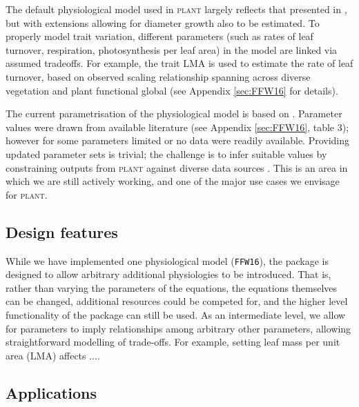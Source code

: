 \documentclass[a4paper,11pt]{article}
\newcommand{\plant}{\textsc{plant}}
\begin{document}
The default physiological model used in {\plant} largely reflects that
presented in \citet{Falster-2011}, but with extensions allowing for
diameter growth also to be estimated. To properly model trait
variation, different parameters (such as rates of leaf turnover,
respiration, photosynthesis per leaf area) in the model are linked via
assumed tradeoffs. For example, the trait LMA is used to estimate the
rate of leaf turnover, based on observed scaling relationship spanning
across diverse vegetation and plant functional global
\citep{Wright-2004} (see Appendix \ref{sec:FFW16} for details).

The current parametrisation of the physiological model is based on
\citet{Falster-2011}. Parameter values were drawn from available
literature (see Appendix \ref{sec:FFW16}, table 3); however for some
parameters limited or no data were readily available. Providing
updated parameter sets is trivial; the challenge is to infer suitable
values by constraining outputs from {\plant} against diverse data
sources \citep{Lebauer-2012, Keenan-2013}. This is an area in which we
are still actively working, and one of the major use cases we envisage
for {\plant}.

\subsection{Design features}

While we have implemented one physiological model (\texttt{FFW16}),
the package is designed to allow arbitrary additional physiologies to
be introduced.  That is, rather than varying the parameters of the
equations, the equations themselves can be changed, additional
resources could be competed for, and the higher level functionality of
the package can still be used.  As an intermediate level, we allow for
parameters to imply relationships among arbitrary other parameters,
allowing straightforward modelling of trade-offs.  For example,
setting leaf mass per unit area (LMA) affects ....

\subsection{Applications}
\end{document}
